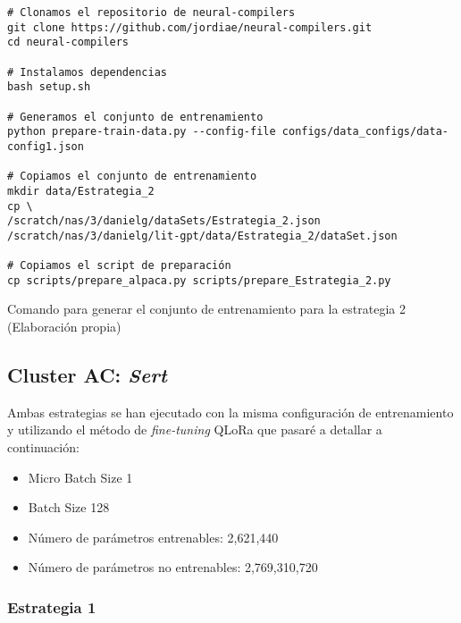 \begin{mycode}
    \begin{verbatim}
# Clonamos el repositorio de neural-compilers
git clone https://github.com/jordiae/neural-compilers.git
cd neural-compilers

# Instalamos dependencias
bash setup.sh

# Generamos el conjunto de entrenamiento
python prepare-train-data.py --config-file configs/data_configs/data-config1.json

# Copiamos el conjunto de entrenamiento
mkdir data/Estrategia_2
cp \
/scratch/nas/3/danielg/dataSets/Estrategia_2.json 
/scratch/nas/3/danielg/lit-gpt/data/Estrategia_2/dataSet.json

# Copiamos el script de preparación
cp scripts/prepare_alpaca.py scripts/prepare_Estrategia_2.py
    \end{verbatim}
    \caption[Comando para generar el conjunto de entrenamiento para la estrategia 2]{Comando para generar el conjunto de entrenamiento para la estrategia 2 (Elaboración propia)}
    \label{code:DataSet_Estrategia_2}
\end{mycode}

\subsection{Cluster AC: \textit{Sert}}
\label{subsec:cluster_ac_ejecucion}


Ambas estrategias se han ejecutado con la misma configuración de entrenamiento y
utilizando el método de \textit{fine-tuning} QLoRa que pasaré a detallar a continuación:

\begin{itemize}
    \item Micro Batch Size 1
    \item Batch Size 128
    \item Número de parámetros entrenables: 2,621,440
    \item Número de parámetros no entrenables: 2,769,310,720
\end{itemize}

\subsubsection{Estrategia 1}
\label{subsubsec:cluster_ac_ejecucion:estrategia_1}


